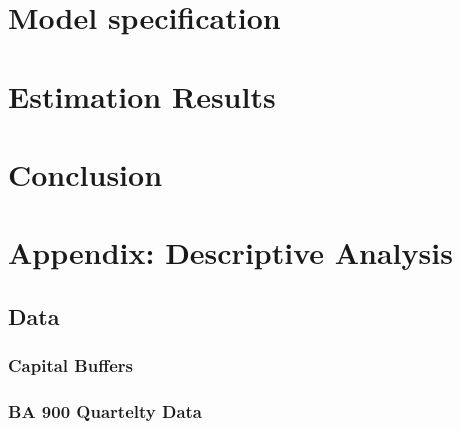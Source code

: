 \documentclass[
]{article}
\begin{document}
\citet{altunbas2004bank}

\citet{gambacorta2018bank}

\citet{berrospide2010effects}

\hypertarget{model-specification}{%
\section{Model specification}\label{model-specification}}

\hypertarget{estimation-results}{%
\section{Estimation Results}\label{estimation-results}}

\hypertarget{conclusion}{%
\section{Conclusion}\label{conclusion}}

\newpage

\hypertarget{appendix-descriptive-analysis}{%
\section{Appendix: Descriptive Analysis}\label{appendix-descriptive-analysis}}

\hypertarget{data}{%
\subsection{Data}\label{data}}

\hypertarget{capital-buffers}{%
\subsubsection{Capital Buffers}\label{capital-buffers}}

\hypertarget{ba-900-quartelty-data}{%
\subsubsection{BA 900 Quartelty Data}\label{ba-900-quartelty-data}}
\end{document}
